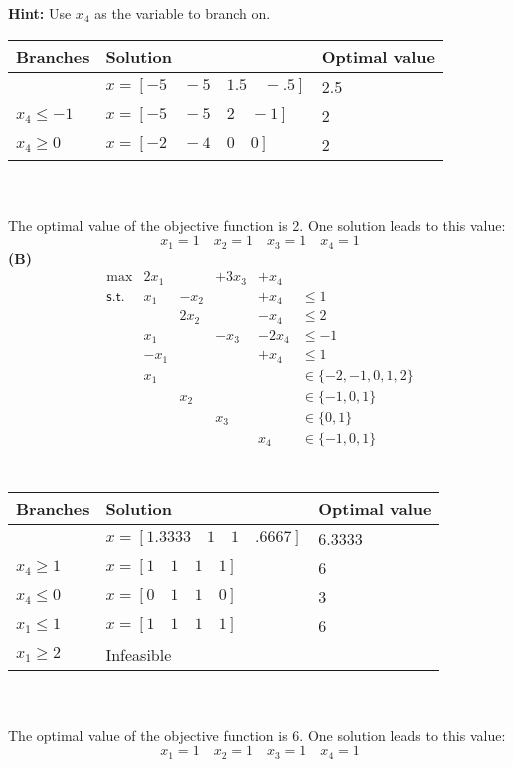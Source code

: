 \documentclass[11pt]{article}
\begin{document}
\noindent\textbf{Hint:} Use $x_4$ as the variable to branch on.
\\
\begin{tabular}{|l|l|l|}
\hline
Branches & Solution & Optimal value \\ \hline
& $x = [-5\quad-5\quad1.5\quad-.5]$ & 2.5 \\ \hline
$x_4 \leq -1$ & $x = [-5\quad-5\quad2\quad-1]$ & 2\\ \hline
$x_4 \geq 0$ & $x = [-2\quad-4\quad0\quad0]$ & 2 \\ \hline
\end{tabular}
\\ \\
The optimal value of the objective function is 2.  One solution leads to this value: 
$$
x_1 = 1 \quad x_2 = 1 \quad x_3 = 1 \quad x_4 = 1
$$
\noindent\textbf{(B)} 
\[ \begin{array}{rlllll}
\max & 2 x_1 &  & + 3 x_3 & + x_4 \\
\mathsf{s.t.}  & x_1 & - x_2 &  & + x_4 & \leq 1 \\
&  & 2 x_2 &  & - x_4 & \leq 2 \\
& x_1 &  & - x_3 & - 2 x_4 & \leq -1 \\
& -x_1 & &   & + x_4 & \leq 1\\
& x_1 &  &   &    & \in \{ -2,-1, 0, 1,2 \} \\
&   & x_2 &  &    & \in \{ -1, 0, 1 \} \\
&   &     & x_3 & & \in \{ 0, 1\} \\
&   &     &    & x_4 & \in \{ -1, 0, 1\} \\
\end{array}\]
\\
\begin{tabular}{|l|l|l|}
\hline
Branches & Solution & Optimal value \\ \hline
& $x = [1.3333\quad1\quad1\quad.6667]$ & 6.3333 \\ \hline
$x_4 \geq 1$ & $x = [1\quad1\quad1\quad1]$ & 6 \\ \hline
$x_4 \leq 0$ & $x = [0\quad1\quad1\quad0]$ & 3 \\ \hline
$x_1 \leq 1$ & $x = [1\quad1\quad1\quad1]$ & 6 \\ \hline
$x_1 \geq 2$ & Infeasible & \\ \hline
\end{tabular}
\\ \\
The optimal value of the objective function is 6.  One solution leads to this value:
$$
x_1 = 1 \quad x_2 = 1 \quad x_3 = 1 \quad x_4 = 1
$$
\end{document}
